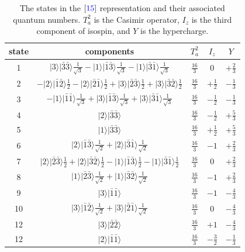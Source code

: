 \documentclass[11pt]{article}
\begin{document}
\begin{table}
\caption{The states in the $[{\color{blue}15}]$ representation and their associated quantum numbers.  $T^2_a$ is the Casimir operator, $I_z$ is the third component of isospin, and $Y$ is the hypercharge.\label{tab:15}}
\center
\begin{tabular}{c|c|c|c|c}
state&components& $T_a^2$ & $I_z$ & $Y$\\
\hline\hline
1& $|3\rangle|\bar{3}\bar{3}\rangle\frac{1}{\sqrt{3}}-|1\rangle|\bar{1}\bar{3}\rangle\frac{1}{\sqrt{3}}-|1\rangle|\bar{3}\bar{1}\rangle\frac{1}{\sqrt{3}}$ &$\frac{16}{3}$ &$0$ & $+\frac{2}{3}$\\
\hline
2& $-|2\rangle|\bar{1}\bar{2}\rangle\frac{1}{2}-|2\rangle|\bar{2}\bar{1}\rangle\frac{1}{2}+|3\rangle|\bar{2}\bar{3}\rangle\frac{1}{2}+|3\rangle|\bar{3}\bar{2}\rangle\frac{1}{2}$ &$\frac{16}{3}$ &$+\frac{1}{2}$ & $-\frac{1}{3}$\\
3& $-|1\rangle|\bar{1}\bar{1}\rangle\frac{1}{\sqrt{3}}+|3\rangle|\bar{1}\bar{3}\rangle\frac{1}{\sqrt{3}}+|3\rangle|\bar{3}\bar{1}\rangle\frac{1}{\sqrt{3}}$ &$\frac{16}{3}$ &$-\frac{1}{2}$ & $-\frac{1}{3}$\\
\hline
4& $|2\rangle|\bar{3}\bar{3}\rangle$ &$\frac{16}{3}$ &$-\frac{1}{2}$ & $+\frac{5}{3}$\\
5& $|1\rangle|\bar{3}\bar{3}\rangle$ &$\frac{16}{3}$ &$+\frac{1}{2}$ & $+\frac{5}{3}$\\
\hline
6& $|2\rangle|\bar{1}\bar{3}\rangle\frac{1}{\sqrt{2}}+|2\rangle|\bar{3}\bar{1}\rangle\frac{1}{\sqrt{2}}$ &$\frac{16}{3}$ & $-1$ & $+\frac{2}{3}$\\
7& $|2\rangle|\bar{2}\bar{3}\rangle\frac{1}{2}+|2\rangle|\bar{3}\bar{2}\rangle\frac{1}{2}-|1\rangle|\bar{1}\bar{3}\rangle\frac{1}{2}-|1\rangle|\bar{3}\bar{1}\rangle\frac{1}{2}$ &$\frac{16}{3}$ & $0$ & $+\frac{2}{3}$\\
8&$|1\rangle|\bar{2}\bar{3}\rangle\frac{1}{\sqrt{2}}+|1\rangle|\bar{3}\bar{2}\rangle\frac{1}{\sqrt{2}}$ &$\frac{16}{3}$ & $-1$ & $+\frac{2}{3}$\\
\hline
9& $|3\rangle|\bar{1}\bar{1}\rangle$ &$\frac{16}{3}$ &$-1$ & $-\frac{4}{3}$\\
10& $|3\rangle|\bar{1}\bar{2}\rangle\frac{1}{\sqrt{2}}+|3\rangle|\bar{2}\bar{1}\rangle\frac{1}{\sqrt{2}}$ &$\frac{16}{3}$ &$0$ & $-\frac{4}{3}$\\
12& $|3\rangle|\bar{2}\bar{2}\rangle$ &$\frac{16}{3}$ &$+1$ & $-\frac{4}{3}$\\
\hline
12& $|2\rangle|\bar{1}\bar{1}\rangle$ &$\frac{16}{3}$ &$-\frac{3}{2}$ & $-\frac{1}{3}$\\

\end{tabular}
\end{table}
\end{document}
